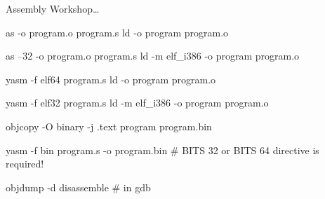 \begin{slide}{Assembly Workshop\dots}{}
  \begin{nicscolumn*}{1cm}{1.7cm}{14cm}
  \end{nicscolumn*}
  \begin{nicscolumn*}{1.5cm}{2.5cm}{5cm}
    \SMALL{}
    \begin{nicsterm}
      as -o program.o program.s
      ld -o program program.o
    \end{nicsterm}
  \end{nicscolumn*}
  \begin{nicscolumn*}{7cm}{2.5cm}{5cm}
    \SMALL{}
    \begin{nicsterm}
      as --32 -o program.o program.s
      ld -m elf_i386 -o program program.o
    \end{nicsterm}
  \end{nicscolumn*}
  \begin{nicscolumn*}{1.5cm}{3.8cm}{5cm}
    \SMALL{}
    \begin{nicsterm}
      yasm -f elf64 program.s
      ld -o program program.o
    \end{nicsterm}
  \end{nicscolumn*}
  \begin{nicscolumn*}{7cm}{3.8cm}{5cm}
    \SMALL{}
    \begin{nicsterm}
      yasm -f elf32 program.s
      ld -m elf_i386 -o program program.o
    \end{nicsterm}
  \end{nicscolumn*}
  \begin{nicscolumn*}{1cm}{5.2cm}{14cm}
  \end{nicscolumn*}
  \begin{nicscolumn*}{1.5cm}{6cm}{10cm}
    \SMALL{}
    \begin{nicsterm}
      objcopy -O binary -j .text program program.bin
    \end{nicsterm}
  \end{nicscolumn*}
  \begin{nicscolumn*}{1.5cm}{6.7cm}{10cm}
    \SMALL{}
    \begin{nicsterm}
      yasm -f bin program.s -o program.bin
      # BITS 32 or BITS 64 directive is required!
    \end{nicsterm}
  \end{nicscolumn*}
  \begin{nicscolumn*}{10cm}{5.2cm}{14cm}
  \end{nicscolumn*}
  \begin{nicscolumn*}{10.5cm}{6cm}{7cm}
    \SMALL{}
    \begin{nicsterm}
      objdump -d
      disassemble  # in gdb
    \end{nicsterm}
  \end{nicscolumn*}
\end{slide}


